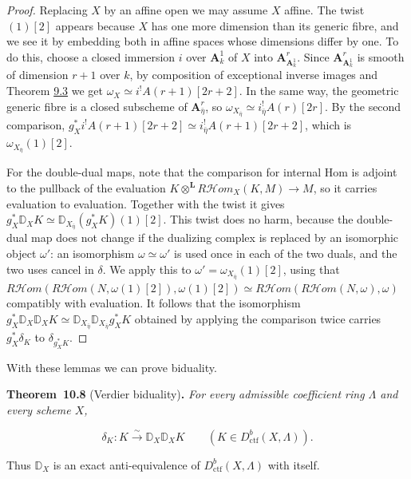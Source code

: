 \documentclass[11pt]{article}
\newenvironment{bpstatement}[2]{\par\addvspace{0.6\baselineskip}\noindent\textbf{#1}#2\textbf{.}\enspace\ignorespaces}
  {\par\addvspace{0.4\baselineskip}}
\newenvironment{bpstatementit}[2]{\begin{bpstatement}{#1}{#2}\itshape\ignorespaces}{\end{bpstatement}}
\providecommand{\cHom}{}\renewcommand{\cHom}{R\mathcal{H}\!om}
\begin{document}
\begin{proof}[{Proof}]\label{bp123}%
Replacing \(X\) by an affine open we may assume \(X\) affine. The twist \((1)[2]\) appears because \(X\) has one more dimension than its generic fibre, and we see it by embedding both in affine spaces whose dimensions differ by one. To do this, choose a closed immersion \(i\) over \(\mathbf A^1_k\) of \(X\) into \(\mathbf A^r_{\mathbf A^1_k}\). Since \(\mathbf A^r_{\mathbf A^1_k}\) is smooth of dimension \(r+1\) over \(k\), by composition of exceptional inverse images and Theorem \hyperref[bp11]{9.3} we get \(\omega_X\simeq i^!A(r+1)[2r+2]\). In the same way, the geometric generic fibre is a closed subscheme of \(\mathbf A^r_{\bar\eta}\), so \(\omega_{X_{\bar\eta}}\simeq i_{\bar\eta}^!A(r)[2r]\). By the second comparison, \(g_X^*i^!A(r+1)[2r+2]\simeq i_{\bar\eta}^!A(r+1)[2r+2]\), which is \(\omega_{X_{\bar\eta}}(1)[2]\).

For the double-dual maps, note that the comparison for internal Hom is adjoint to the pullback of the evaluation \(K\otimes^{\mathbf L}\cHom_X(K,M)\to M\), so it carries evaluation to evaluation. Together with the twist it gives \(g_X^*\mathbb D_XK\simeq\mathbb D_{X_{\bar\eta}}(g_X^*K)(1)[2]\). This twist does no harm, because the double-dual map does not change if the dualizing complex is replaced by an isomorphic object \(\omega'\): an isomorphism \(\omega\simeq\omega'\) is used once in each of the two duals, and the two uses cancel in \(\delta\). We apply this to \(\omega'=\omega_{X_{\bar\eta}}(1)[2]\), using that \(\cHom(\cHom(N,\omega(1)[2]),\omega(1)[2])\simeq\cHom(\cHom(N,\omega),\omega)\) compatibly with evaluation. It follows that the isomorphism \(g_X^*\mathbb D_X\mathbb D_XK\simeq\mathbb D_{X_{\bar\eta}}
\mathbb D_{X_{\bar\eta}}g_X^*K\) obtained by applying the comparison twice carries \(g_X^*\delta_K\) to \(\delta_{g_X^*K}\).
\end{proof}

\label{bp124}%
With these lemmas we can prove biduality.

\label{bp125}%
\begin{bpstatementit}{Theorem~10.8}{ (Verdier biduality)}
For every admissible coefficient ring \(\Lambda\) and every scheme \(X\),

\[
\delta_K:K\xrightarrow{\sim}\mathbb D_X\mathbb D_XK
\qquad(K\in D^b_{\mathrm{ctf}}(X,\Lambda)).
\]

Thus \(\mathbb D_X\) is an exact anti-equivalence of \(D^b_{\mathrm{ctf}}(X,\Lambda)\) with itself.
\end{bpstatementit}
\end{document}
